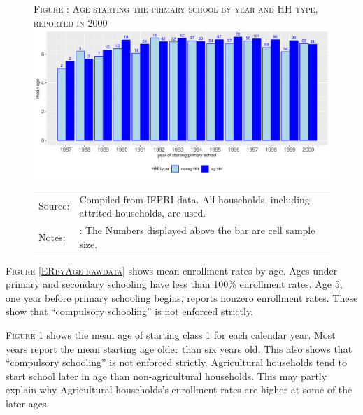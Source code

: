 \documentclass[12pt,letterpaper]{article}
\newcommand{\0}{\ensuremath{\mbox{\boldmath $0$}}}
\begin{document}
{\begin{figure}[h!]
\hfil\textsc{\footnotesize Figure \thefigure: Age starting the primary school by year and HH type, reported in 2000\label{AgeAtClass1byAge rawdata}}\\
\hfil \includegraphics[width=.7\paperwidth]{Figures/AgeAtClass1Enrollment.pdf}\\
\renewcommand{\arraystretch}{1}
\hfil\begin{tabular}{>{\hfill\scriptsize}p{1cm}<{}>{\scriptsize}p{12cm}<{\hfill}}
Source:& Compiled from IFPRI data. All households, including attrited households, are used.\\[-1ex]
Notes:&: The Numbers displayed above the bar are cell sample size. \\[-1ex]
\end{tabular}
\end{figure}

\textsc{\footnotesize Figure \ref{ERbyAge rawdata}} shows mean enrollment rates by age. Ages under primary and secondary schooling have less than 100\% enrollment rates. Age 5, one year before primary schooling begins, reports nonzero enrollment rates. These show that ``compulsory schooling'' is not enforced strictly. 

\textsc{\footnotesize Figure \ref{AgeAtClass1byAge rawdata}} shows the mean age of starting class 1 for each calendar year. Most years report the mean starting age older than six years old. This also shows that ``compulsory schooling'' is not enforced strictly. Agricultural households tend to start school later in age than non-agricultural households. This may partly explain why Agricultural households's enrollment rates are higher at some of the later ages. 




}
\end{document}
